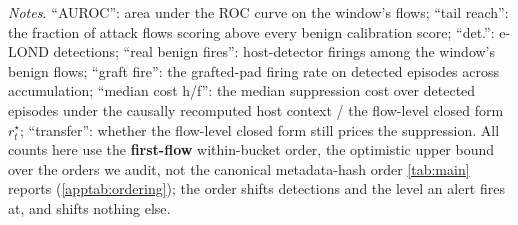 \begin{table}[t]
\centering
\caption{Host-conditioned detector and the padding-transfer boundary on LSPR23 (src--dst two-hour
unit, e-LOND $\gamma\propto j^{-1.6}$, seed 0; \textbf{first-flow} within-bucket order on both legs,
the optimistic upper bound over the orders we audit, not the canonical order \cref{tab:main} reports).
``h/f'': host-conditioned / flow-only detector. Design and reading: \cref{app:ait}.}
\label{apptab:r7host}
\par\vspace{3pt}
{\footnotesize\raggedright \emph{Notes.} ``AUROC'': area under the ROC curve on the window's flows;
``tail reach'': the fraction of attack flows scoring above every benign calibration score; ``det.'': e-LOND detections; ``real benign fires'': host-detector firings among
the window's benign flows; ``graft fire'': the grafted-pad firing rate on detected episodes across
accumulation; ``median cost h/f'': the median suppression cost over detected episodes under the causally
recomputed host context / the flow-level closed form $r^{\star}_t$; ``transfer'': whether the flow-level closed form still prices the suppression. All counts here use the \textbf{first-flow} within-bucket order, the optimistic upper bound over the orders we audit, not the canonical metadata-hash order \cref{tab:main} reports (\cref{apptab:ordering}); the order shifts detections and the level an alert fires at, and shifts nothing else.\par}
\end{table}
